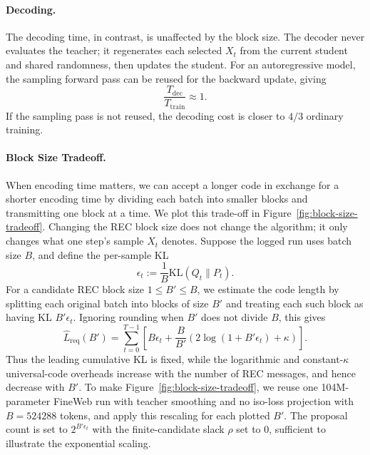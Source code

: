\documentclass{article}
\theoremstyle{plain}
\theoremstyle{definition}
\theoremstyle{remark}
\begin{document}
\paragraph{Decoding.} The decoding time, in contrast, is unaffected by the block size. The decoder never evaluates the teacher; it regenerates each selected $X_t$ from the current student and shared randomness, then updates the student. For an autoregressive model, the sampling forward pass can be reused for the backward update, giving
\begin{equation}
\frac{T_{\mathrm{dec}}}{T_{\mathrm{train}}}\approx 1.
\end{equation}
If the sampling pass is not reused, the decoding cost is closer to $4/3$ ordinary training.


\paragraph{Block Size Tradeoff.}
When encoding time matters, we can accept a longer code in exchange for a shorter encoding time by dividing each batch into smaller blocks and transmitting one block at a time. We plot this trade-off in Figure~\ref{fig:block-size-tradeoff}.
Changing the REC block size does not change the algorithm; it only changes what one step's sample $X_t$ denotes. Suppose the logged run uses batch size $B$, and define the per-sample KL
\begin{equation}
\epsilon_t
:=
\frac{1}{B}\mathrm{KL}(Q_t\|P_t).
\end{equation}
For a candidate REC block size $1\leq B'\leq B$, we estimate the code length by splitting each original batch into blocks of size $B'$ and treating each such block as having KL $B'\epsilon_t$. Ignoring rounding when $B'$ does not divide $B$, this gives
\begin{equation}
\widehat{L}_{\mathrm{req}}(B')
=
\sum_{t=0}^{T-1}
\left[
B\epsilon_t
+
\frac{B}{B'}
\left(
2\log(1+B'\epsilon_t)
+\kappa
\right)
\right].
\end{equation}
Thus the leading cumulative KL is fixed, while the logarithmic and constant-$\kappa$ universal-code overheads increase with the number of REC messages, and hence decrease with $B'$. To make Figure~\ref{fig:block-size-tradeoff}, we reuse one 104M-parameter FineWeb run with teacher smoothing and no iso-loss projection with $B=524288$ tokens, and apply this rescaling for each plotted $B'$. The proposal count is set to $2^{B'\epsilon_t}$ with the finite-candidate slack $\rho$ set to 0, sufficient to illustrate the exponential scaling.
\end{document}
